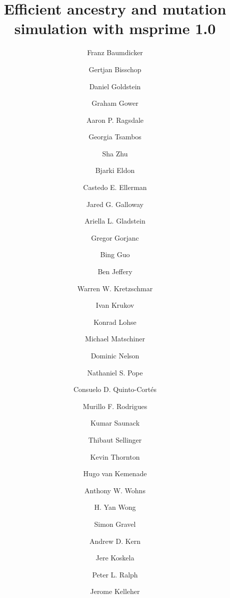 \documentclass{article}
\begin{document}
\title{Efficient ancestry and mutation simulation with msprime 1.0}
\author[1,$\star$]{Franz Baumdicker}
\author[2,$\star$]{Gertjan Bisschop}
\author[3,$\star$]{Daniel Goldstein}
\author[4,$\star$]{Graham Gower}
\author[5,$\star$]{Aaron P. Ragsdale}
\author[6,$\star$]{Georgia Tsambos}
\author[7,$\star$]{Sha Zhu}

\author[8]{Bjarki Eldon}
\author[9]{Castedo E. Ellerman}
\author[10]{Jared G. Galloway}
\author[11,12]{Ariella L. Gladstein}
\author[13]{Gregor Gorjanc}
\author[14]{Bing Guo}
\author[7]{Ben Jeffery}
\author[15]{Warren W. Kretzschmar}
\author[16]{Ivan Krukov}
\author[2]{Konrad Lohse}
\author[17]{Michael Matschiner}
\author[16]{Dominic Nelson}
\author[18]{Nathaniel S. Pope}
\author[19]{Consuelo D. Quinto-Cort\'es}
\author[10]{Murillo F. Rodrigues}
\author[20]{Kumar Saunack}
\author[21]{Thibaut Sellinger}
\author[22]{Kevin Thornton}
\author[9]{Hugo van Kemenade}
\author[7]{Anthony W. Wohns}
\author[7]{H. Yan Wong}

\author[15,$\dagger$]{Simon Gravel}
\author[10,$\dagger$]{Andrew D. Kern}
\author[23,$\dagger$]{Jere Koskela}
\author[10,24,$\dagger$]{Peter L. Ralph}

\author[7,$\ddagger$]{Jerome Kelleher}

\end{document}
